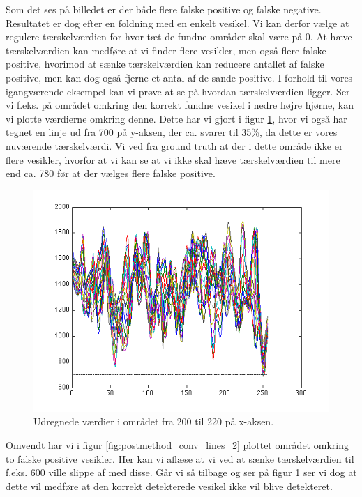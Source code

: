 Som det ses på billedet er der både flere falske positive og falske negative. Resultatet er dog efter en foldning med en enkelt vesikel. Vi kan derfor vælge at regulere tærskelværdien for hvor tæt de fundne områder skal være på 0. At hæve tærskelværdien kan medføre at vi finder flere vesikler, men også flere falske positive, hvorimod at sænke tærskelværdien kan reducere antallet af falske positive, men kan dog også fjerne et antal af de sande positive. I forhold til vores igangværende eksempel kan vi prøve at se på hvordan tærskelværdien ligger. Ser vi f.eks. på området omkring den korrekt fundne vesikel i nedre højre hjørne, kan vi plotte værdierne omkring denne. Dette har vi gjort i figur \ref{fig:postmethod_conv_lines_1}, hvor vi også har tegnet en linje ud fra 700 på y-aksen, der ca. svarer til 35\%, da dette er vores nuværende tærskelværdi. Vi ved fra ground truth at der i dette område ikke er flere vesikler, hvorfor at vi kan se at vi ikke skal hæve tærskelværdien til mere end ca. 780 før at der vælges flere falske positive. 

\begin{figure}[H]
		\centering
		\includegraphics[scale=0.9]{files/postmethod/img/conv_lines_1.png}
	\caption{Udregnede værdier i området fra 200 til 220 på x-aksen. \label{fig:postmethod_conv_lines_1}}
\end{figure}

Omvendt har vi i figur \ref{fig:postmethod_conv_lines_2} plottet området omkring to falske positive vesikler. Her kan vi aflæse at vi ved at sænke tærskelværdien til f.eks. 600 ville slippe af med disse. Går vi så tilbage og ser på figur \ref{fig:postmethod_conv_lines_1} ser vi dog at dette vil medføre at den korrekt detekterede vesikel ikke vil blive detekteret.


